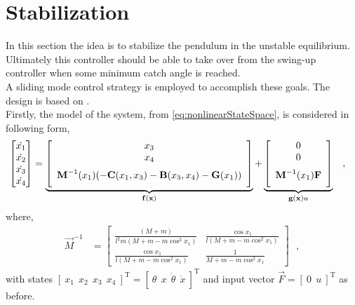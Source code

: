 %
\chapter{Stabilization}
In this section the idea is to stabilize the pendulum in the unstable equilibrium. Ultimately this controller should be able to take over from the swing-up controller when some minimum catch angle is reached.\\
A sliding mode control strategy is employed to accomplish these goals. The design is based on \cite{HKKhalil}.\\
Firstly, the model of the system, from \autoref{eq:nonlinearStateSpace}, is considered in following form,
\begin{align}
  \begin{bmatrix}
    \dot{x_1} \\
    \dot{x_2} \\
    \dot{x_3} \\
    \dot{x_4}
  \end{bmatrix}
  &=
  \underbrace{
    \left[
      \begin{array}{c}
        x_3 \\
        x_4 \\
        \multirow{2}{*}{$ \vec{M}^{-1}(x_1) ( - \vec{C}(x_1,x_3) - \vec{B}(x_3,x_4) - \vec{G}(x_1) ) $}\\
        \phantom{eq}
      \end{array}
    \right]
  }_{\vec{f}(\vec{x})}
  +
  \underbrace{
    \left[
      \begin{array}{c}
        0 \\
        0 \\
        \multirow{2}{*}{$ \vec{M}^{-1}(x_1) \vec{F} $}\\
        \phantom{eq}
      \end{array}
    \right]
  }_{\vec{g}(\vec{x}) u}
\label{eq:nonlinearStateSpace2} \ \ \ ,
\end{align}
%
where,
\begin{align}
  \vec{M}^{-1}
  &=
  \begin{bmatrix}
    \frac{(M + m)}{l^2 m ( M + m - m \cos^2 x_1 )}  &  \frac{\cos x_1}{l (M + m - m \cos^2 x_1)} \\
    \frac{\cos x_1}{l (M + m - m \cos^2 x_1)}       &  \frac{1}{M + m - m \cos^2 x_1}
  \end{bmatrix}  \ \ \ ,
\end{align}
%
with states $ [\ x_1\ \ x_2\ \ x_3\ \ x_4\ ]^\mathrm{T} = [\ \theta\ \ x\ \ \dot{\theta}\ \ \dot{x}\ ]^\mathrm{T} $ and input vector $\vec{F} = [\ 0 \ \ u \ ]^\mathrm{T}$ as before.

